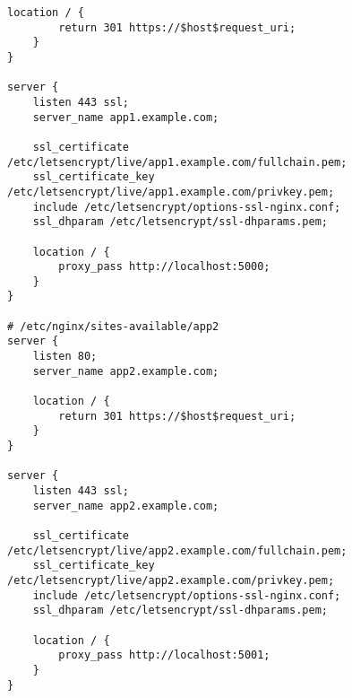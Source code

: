 \begin{itemize}
\begin{lstlisting}[language=none]
    location / {
        return 301 https://$host$request_uri;
    }
}

server {
    listen 443 ssl;
    server_name app1.example.com;

    ssl_certificate /etc/letsencrypt/live/app1.example.com/fullchain.pem;
    ssl_certificate_key /etc/letsencrypt/live/app1.example.com/privkey.pem;
    include /etc/letsencrypt/options-ssl-nginx.conf;
    ssl_dhparam /etc/letsencrypt/ssl-dhparams.pem;

    location / {
        proxy_pass http://localhost:5000;
    }
}

# /etc/nginx/sites-available/app2
server {
    listen 80;
    server_name app2.example.com;

    location / {
        return 301 https://$host$request_uri;
    }
}

server {
    listen 443 ssl;
    server_name app2.example.com;

    ssl_certificate /etc/letsencrypt/live/app2.example.com/fullchain.pem;
    ssl_certificate_key /etc/letsencrypt/live/app2.example.com/privkey.pem;
    include /etc/letsencrypt/options-ssl-nginx.conf;
    ssl_dhparam /etc/letsencrypt/ssl-dhparams.pem;

    location / {
        proxy_pass http://localhost:5001;
    }
}
\end{lstlisting}
\end{itemize}
